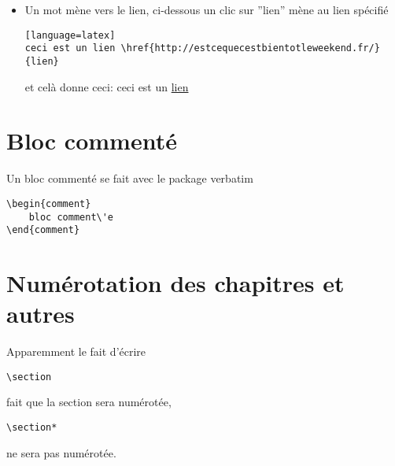 \begin{itemize}
\item Un mot m\`ene vers le lien, ci-dessous un clic sur ''lien'' m\`ene au lien spécifi\'e

\begin{lstlisting}[caption={Insertion de liens Internet}][language=latex]
ceci est un lien \href{http://estcequecestbientotleweekend.fr/}{lien}
\end{lstlisting}

et cel\`a donne ceci:\newline
ceci est un \href{http://estcequecestbientotleweekend.fr/}{lien}
\end{itemize}






\section{Bloc comment\'e}
Un bloc comment\'e se fait avec le package verbatim
\begin{verbatim}
\begin{comment}
	bloc comment\'e
\end{comment}
\end{verbatim}



\section{Num\'erotation des chapitres et autres}
Apparemment le fait d'\'ecrire 

\begin{verbatim}
\section
\end{verbatim}

fait que la section sera num\'erot\'ee, 

\begin{verbatim}
\section*
\end{verbatim}

ne sera pas num\'erot\'ee.




\begin{comment}
\section{Underscore}
Il faut penser \`{a} \'echapper les underscore sinon la compilation plante. On \'echappe avec 
\end{comment}


